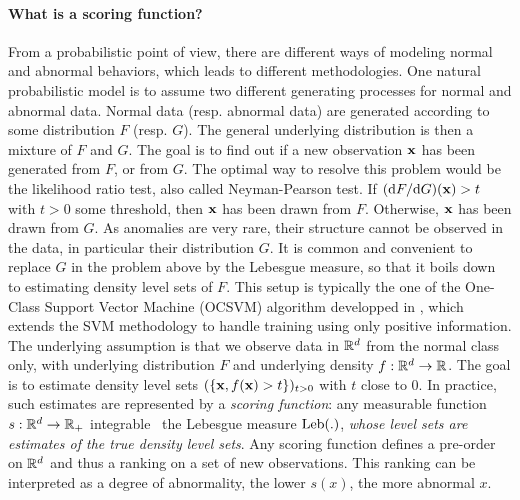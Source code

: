 \paragraph{What is a scoring function?}
From a probabilistic point of view, there are different ways of modeling normal and abnormal behaviors, which leads to different methodologies. One natural probabilistic model is to assume two different generating processes for normal and abnormal data. Normal data (resp. abnormal data) are generated according to some distribution $F$ (resp. $G$). The general underlying distribution is then a mixture of $F$ and $G$. The goal is to find out if a new observation $\mathbf x$ has been generated from $F$, or from $G$. The optimal way to resolve %
this problem would be the likelihood ratio test, also called Neyman-Pearson test. If $(\mathrm{d}  F / \mathrm{d}  G) ( \mathbf x) > t$ with $t>0$ some threshold, then $\mathbf x$ has been drawn from $F$. Otherwise, $\mathbf x$ has been drawn from $G$. %
%
As anomalies are very rare, their structure cannot be observed in the data, in particular their distribution $G$. 
%
It is common and convenient \citep{Vert06thesis} to replace $G$ in the problem above by the Lebesgue measure, so that it boils down to estimating density level sets of $F$. 
%
This setup is typically the one of the One-Class Support Vector Machine (OCSVM) algorithm developped in \cite{Scholkopf2001}, which extends the SVM methodology \citep{Cortes1995, Shawe2004} to handle training using only positive information.
The underlying assumption is that we observe data in $\mathbb{R}^d$ from the normal class only, with underlying distribution $F$ and underlying density $f: \mathbb{R}^d \to \mathbb{R}$. The goal is to estimate density level sets $(\{\mathbf x, f( \mathbf x) > t\})_{t>0}$ with $t$ close to $0$.
%
In practice, such estimates are represented by a \emph{scoring function}: any measurable function $s: \mathbb{R}^d \to \mathbb{R}_+$ integrable \wrt~the Lebesgue measure $\text{Leb}(.)$, \emph{whose level sets are estimates of the true density level sets}. 
Any scoring function defines a pre-order on $\mathbb{R}^d$ and thus a ranking on a set of new observations. This ranking can be interpreted as a degree of abnormality, the lower $s(x)$, the more abnormal $x$. 
